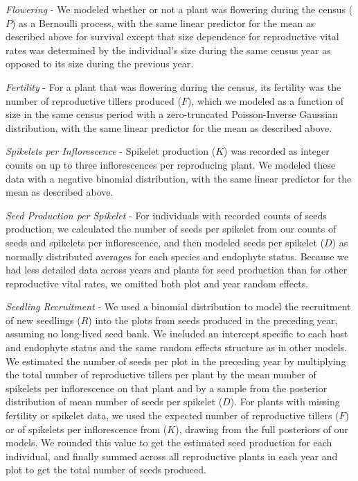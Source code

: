 \documentclass[12pt]{article}
\begin{document}
\emph{Flowering} - We modeled whether or not a plant was flowering during the census ($P$) as a Bernoulli process, with the same linear predictor for the mean as described above for survival except that size dependence for reproductive vital rates was determined by the individual's size during the same census year as opposed to its size during the previous year.

\emph{Fertility} - For a plant that was flowering during the census, its fertility was the number of reproductive tillers produced ($F$), which we modeled as a function of size in the same census period with a zero-truncated Poisson-Inverse Gaussian distribution, with the same linear predictor for the mean as described above. 

\emph{Spikelets per Inflorescence} - Spikelet production ($K$) was recorded as integer counts on up to three inflorescences per reproducing plant.
We modeled these data with a negative binomial distribution, with the same linear predictor for the mean as described above. 

\emph{Seed Production per Spikelet} - For individuals with recorded counts of seeds production, we calculated the number of seeds per spikelet from our counts of seeds and spikelets per inflorescence, and then modeled seeds per spikelet ($D$) as normally distributed averages for each species and endophyte status. 
Because we had less detailed data across years and plants for seed production than for other reproductive vital rates, we omitted both plot and year random effects. 

\emph{Seedling Recruitment} - We used a binomial distribution to model the recruitment of new seedlings ($R$) into the plots from seeds produced in the preceding year, assuming no long-lived seed bank. 
We included an intercept specific to each host and endophyte status and the same random effects structure as in other models. 
We estimated the number of seeds per plot in the preceding year by multiplying the total number of reproductive tillers per plant by the mean number of spikelets per inflorescence on that plant and by a sample from the posterior distribution of mean number of seeds per spikelet ($D$).
For plants with missing fertility or spikelet data, we used the expected number of reproductive tillers ($F$) or of spikelets per inflorescence from ($K$), drawing from the full posteriors of our models. 
We rounded this value to get the estimated seed production for each individual, and finally summed across all reproductive plants in each year and plot to get the total number of seeds produced. 
\end{document}

